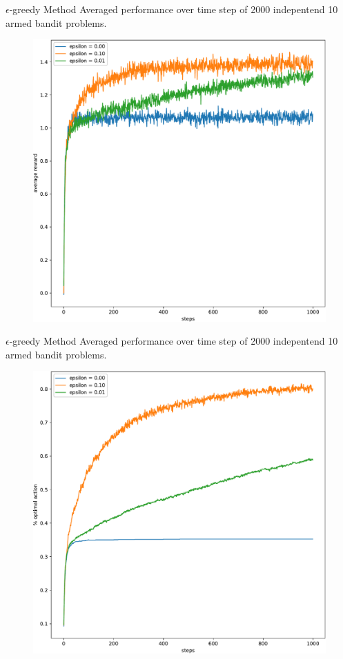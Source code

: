 \documentclass{beamer}
\begin{document}
\begin{frame}{$\epsilon$-greedy Method}
Averaged performance over time step of 2000 indepentend 10 armed bandit problems.
	\begin{figure}
	\centering
	\includegraphics[width=0.6\linewidth]{Images/figure_2_2_a-crop.pdf}
	\end{figure}
\end{frame}

\begin{frame}{$\epsilon$-greedy Method}
Averaged performance over time step of 2000 indepentend 10 armed bandit problems.
	\begin{figure}
	\centering
	\includegraphics[width=0.6\linewidth]{Images/figure_2_2_b-crop.pdf}
	\end{figure}
\end{frame}
\end{document}
